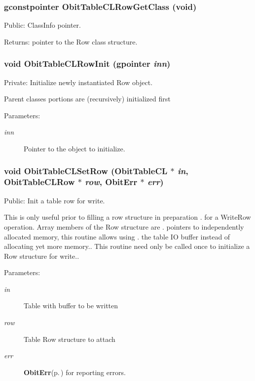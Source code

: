 \subsubsection{\setlength{\rightskip}{0pt plus 5cm}gconstpointer Obit\-Table\-CLRow\-Get\-Class (void)}\label{ObitTableCL_8c_a15}


Public: Class\-Info pointer. 

\begin{Desc}
\item[Returns:]pointer to the Row class structure. \end{Desc}
\subsubsection{\setlength{\rightskip}{0pt plus 5cm}void Obit\-Table\-CLRow\-Init (gpointer {\em inn})}\label{ObitTableCL_8c_a6}


Private: Initialize newly instantiated Row object. 

Parent classes portions are (recursively) initialized first \begin{Desc}
\item[Parameters:]
\begin{description}
\item[{\em inn}]Pointer to the object to initialize. \end{description}
\end{Desc}
\subsubsection{\setlength{\rightskip}{0pt plus 5cm}void Obit\-Table\-CLSet\-Row ({\bf Obit\-Table\-CL} $\ast$ {\em in}, {\bf Obit\-Table\-CLRow} $\ast$ {\em row}, {\bf Obit\-Err} $\ast$ {\em err})}\label{ObitTableCL_8c_a23}


Public: Init a table row for write. 

This is only useful prior to filling a row structure in preparation . for a Write\-Row operation. Array members of the Row structure are . pointers to independently allocated memory, this routine allows using . the table IO buffer instead of allocating yet more memory.. This routine need only be called once to initialize a Row structure for write.. \begin{Desc}
\item[Parameters:]
\begin{description}
\item[{\em in}]Table with buffer to be written \item[{\em row}]Table Row structure to attach \item[{\em err}]{\bf Obit\-Err}{\rm (p.\,\pageref{structObitErr})} for reporting errors. \end{description}
\end{Desc}
